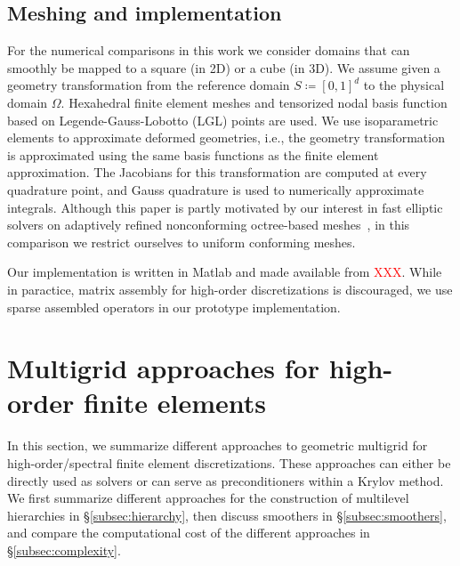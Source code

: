 \documentclass[smallcondensed,final]{svjour3}     %
\newcommand{\todo}[1]{\textcolor{red}{ #1}}
\begin{document}

\subsection{Meshing and implementation} %
\label{sub:meshing}

For the numerical comparisons in this work we consider domains that
can smoothly be mapped to a square (in 2D) or a cube (in 3D). We
assume given a geometry transformation from the reference domain
$S\coloneqq[0,1]^d$ to the physical domain $\Omega$. Hexahedral finite
element meshes and tensorized nodal basis function based on
Legende-Gauss-Lobotto (LGL) points are used.  We use isoparametric
elements to approximate deformed geometries, i.e., the geometry
transformation is approximated using the same basis functions as the
finite element approximation. The Jacobians for this transformation
are computed at every quadrature point, and Gauss quadrature is used
to numerically approximate integrals.  Although this paper is partly
motivated by our interest in fast elliptic solvers on adaptively
refined nonconforming octree-based
meshes~\cite{SundarBirosBursteddeEtAl12, SampathBiros10}, in this
comparison we restrict ourselves to uniform conforming meshes.

Our implementation is written in Matlab and made available from
\todo{XXX}. While in paractice, matrix assembly for
high-order discretizations is discouraged, we use sparse
assembled operators in our prototype implementation.








\section{Multigrid approaches for high-order finite elements}
\label{sec:approaches}

In this section, we summarize different approaches to geometric
multigrid for high-order/spectral finite element
discretizations. These approaches can either be directly used as
solvers or can serve as preconditioners within a Krylov method. We
first summarize different approaches for the construction of
multilevel hierarchies in \S\ref{subsec:hierarchy}, then discuss
smoothers in \S\ref{subsec:smoothers}, and compare the
computational cost of the different approaches in
\S\ref{subsec:complexity}.
\end{document}
